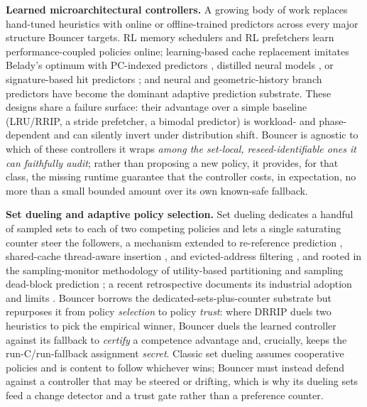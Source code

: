 \textbf{Learned microarchitectural controllers.} A growing body of work replaces hand-tuned heuristics with online or offline-trained predictors across every major structure Bouncer targets. RL memory schedulers \citep{ipek2008selfoptimizing} and RL prefetchers \citep{bera2021pythia} learn performance-coupled policies online; learning-based cache replacement imitates Belady's optimum with PC-indexed predictors \citep{jain2016hawkeye}, distilled neural models \citep{shi2019glider}, or signature-based hit predictors \citep{wu2011ship}; and neural and geometric-history branch predictors \citep{jimenez2001perceptron, seznec2006tage} have become the dominant adaptive prediction substrate. These designs share a failure surface: their advantage over a simple baseline (LRU/RRIP, a stride prefetcher, a bimodal predictor) is workload- and phase-dependent and can silently invert under distribution shift. Bouncer is agnostic to which of these controllers it wraps \emph{among the set-local, reseed-identifiable ones it can faithfully audit}; rather than proposing a new policy, it provides, for that class, the missing runtime guarantee that the controller costs, in expectation, no more than a small bounded amount over its own known-safe fallback.

\textbf{Set dueling and adaptive policy selection.} Set dueling \citep{qureshi2007dip} dedicates a handful of sampled sets to each of two competing policies and lets a single saturating counter steer the followers, a mechanism extended to re-reference prediction \citep{jaleel2010rrip}, shared-cache thread-aware insertion \citep{jaleel2008tadip}, and evicted-address filtering \citep{seshadri2012eaf}, and rooted in the sampling-monitor methodology of utility-based partitioning \citep{qureshi2006ucp} and sampling dead-block prediction \citep{khan2010sdbp}; a recent retrospective documents its industrial adoption and limits \citep{qureshi2007retro}. Bouncer borrows the dedicated-sets-plus-counter substrate but repurposes it from policy \emph{selection} to policy \emph{trust}: where DRRIP duels two heuristics to pick the empirical winner, Bouncer duels the learned controller against its fallback to \emph{certify} a competence advantage and, crucially, keeps the run-C/run-fallback assignment \emph{secret}. Classic set dueling assumes cooperative policies and is content to follow whichever wins; Bouncer must instead defend against a controller that may be steered or drifting, which is why its dueling sets feed a change detector and a trust gate rather than a preference counter.

